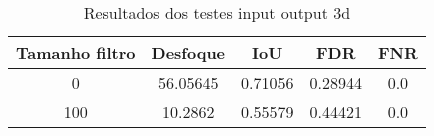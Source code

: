 \begin{table}[h]
            \centering
            \caption{Resultados dos testes input output 3d}
            \label{tab:blur_error_input_output_3d}
            \begin{tabular}{|c|c|c|c|c|}
                \hline
                                Tamanho filtro & Desfoque & IoU & FDR & FNR \\
                \hline
                0 & 56.05645 & 0.71056 & 0.28944 & 0.0\\
        100 & 10.2862 & 0.55579 & 0.44421 & 0.0\\
                \hline
            \end{tabular}
        \end{table}


